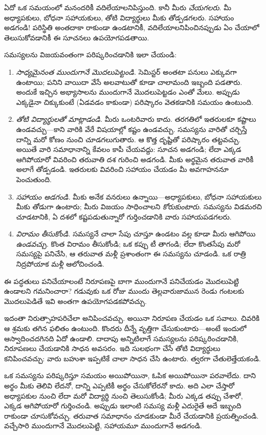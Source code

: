 \documentclass[../../../include/open-logic-section]{subfiles}
\begin{document}


ఏదో ఒక సమయంలో మనందరికీ వదిలేయాలనిపిస్తుంది. కానీ మీరు \emph{చేయగలరు}. మీ అధ్యాపకులు, బోధనా సహాయకులు, తోటి విద్యార్థులు మీకు తోడ్పడగలరు. సహాయం అడగండి!{} పరిస్థితి అంతదాకా రాకుండా ఉండటానికీ, వదిలేయాలనిపించినప్పుడు ఏం చేయాలో తెలుసుకోవడానికీ ఈ సూచనలు ఉపయోగపడతాయి.

సమస్యలను విజయవంతంగా పరిష్కరించడానికి ఇలా చేయండి:
\begin{enumerate}
\item \emph{సాధ్యమైనంత ముందుగానే మొదలుపెట్టండి.} సెమిస్టర్ అంతటా పనులు ఎక్కువగా ఉంటాయి; పనిని వాయిదా వేసే అలవాటుతో కూడా చాలామంది ఇబ్బంది పడతారు. అందుకే ఇచ్చిన అభ్యాసాలను ముందుగానే మొదలుపెట్టడం ఎంతో మేలు. అప్పుడు ఎక్కడైనా చిక్కుకుంటే (ఏడవడం కాకుండా) పరిష్కారం వెతకడానికి సమయం ఉంటుంది.
\item \emph{తోటి విద్యార్థులతో మాట్లాడండి.} మీరు ఒంటరివారు కాదు. తరగతిలో ఇతరులకూ కష్టాలు ఉండవచ్చు---కాని వారికి వేరే విషయాల్లో కష్టం ఉండవచ్చు. సమస్యను వారితో చర్చిస్తే దాన్ని మరో కోణం నుంచి చూడగలుగుతారు. ఆ కొత్త దృష్టితో పరిష్కారం తట్టవచ్చు. అయితే వారి సమాధానాన్ని కేవలం కాపీ చేయవద్దు: సూచన అడగండి; లేదా ఎక్కడ ఆగిపోయారో వివరించి తరువాతి దశ గురించి అడగండి. మీకు అర్థమైన తరువాత వారికీ అలాగే తోడ్పడండి. ఇతరులకు వివరించి సహాయం చేయడం మీ అవగాహననూ పెంచుతుంది.
\item \emph{సహాయం అడగండి.} మీకు అనేక వనరులు ఉన్నాయి---అధ్యాపకులు, బోధనా సహాయకులు మీకు తోడుగా ఉంటారు; మీరు విజయం సాధించాలని \emph{కోరుకుంటారు}. సమస్యను విడమరచి చూడటానికి, ఏ దశలో కష్టపడుతున్నారో గుర్తించడానికి వారు సహాయపడగలరు.
\item \emph{విరామం తీసుకోండి.} సమస్యనే చాలా సేపు చూస్తూ ఉండటం వల్ల కూడా మీరు ఆగిపోయి \emph{ఉండవచ్చు}. కొంత విరామం తీసుకోండి; ఒక కప్పు టీ తాగండి; లేదా కొంతసేపు మరో సమస్యపై పనిచేసి, ఆ తరువాత మళ్లీ ప్రశాంతంగా ఈ సమస్యను చూడండి. ఒక రాత్రి నిద్రపోయాక మళ్లీ ఆలోచించండి.
\end{enumerate}

ఈ పద్ధతులు పనిచేయాలంటే నిరూపణపై బాగా ముందుగానే పనిచేయడం మొదలుపెట్టి ఉండాలని గమనించారా? గడువుకు ఒక రోజు ముందు తెల్లవారుజామున రెండు గంటలకు మొదలుపెడితే ఇవి అంతగా ఉపయోగపడకపోవచ్చు.

ఇదంతా నిరుత్సాహపరిచేలా అనిపించవచ్చు. అయినా నిరూపణ చేయడం ఒక సవాలు. చివరికి ఆ శ్రమకు తగిన ఫలితం ఉంటుంది. కొందరు దీన్నే వృత్తిగా చేసుకుంటారు---అంటే ఇందులో ఆస్వాదించదగినది ఏదో ఉండాలి. దాదాపు అన్నిటిలాగే సమస్యలను పరిష్కరించడానికి, నిరూపణలు చేయడానికి సాధన అవసరం. ఇది సులభంగా చేసే తోటి విద్యార్థులు కనిపించవచ్చు: వారు బహుశా ఇప్పటికే చాలా సాధన చేసి ఉంటారు. త్వరగా చేతులెత్తేయకండి.

ఒక సమస్యను పరిష్కరిస్తూ సమయం అయిపోయినా, ఓపిక అయిపోయినా పరవాలేదు. దాని అర్థం మీకు తెలివి లేదనో, దాన్ని ఎప్పటికీ అర్థం చేసుకోలేరనో కాదు. అది ఎలా చేస్తారో అధ్యాపకుల నుంచి లేదా మరో విద్యార్థి నుంచి తెలుసుకోండి; మీరు ఎక్కడ తప్పు చేశారో, ఎక్కడ ఆగిపోయారో గుర్తించండి. అప్పుడు ఇలాంటి సమస్య మళ్లీ ఎదురైతే అదే ఇబ్బంది రాకుండా చూసుకోవచ్చు. తరువాత సమాధానం చూడకుండా మీరే చేయడానికి ప్రయత్నించండి. వచ్చేసారి ముందుగానే మొదలుపెట్టి, సహాయమూ ముందుగానే అడగండి.
\end{document}
